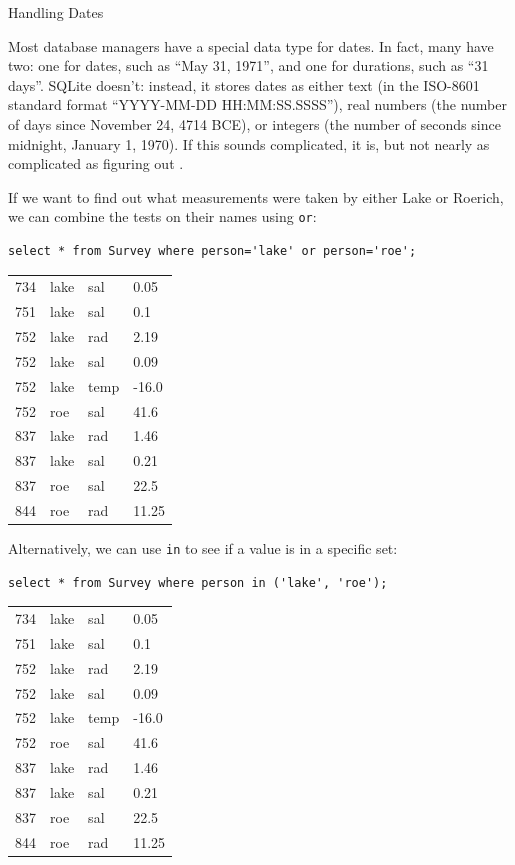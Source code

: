\documentclass{book}
\begin{document}
\begin{swcbox}{Handling Dates}

Most database managers have a special data type for dates. In fact, many
have two: one for dates, such as ``May 31, 1971'', and one for
durations, such as ``31 days''. SQLite doesn't: instead, it stores dates
as either text (in the ISO-8601 standard format ``YYYY-MM-DD
HH:MM:SS.SSSS''), real numbers (the number of days since November 24,
4714 BCE), or integers (the number of seconds since midnight, January 1,
1970). If this sounds complicated, it is, but not nearly as complicated
as figuring out
.

\end{swcbox}

If we want to find out what measurements were taken by either Lake or
Roerich, we can combine the tests on their names using \texttt{or}:

\begin{verbatim}
select * from Survey where person='lake' or person='roe';
\end{verbatim}

\begin{tabular}{llll}
734 & lake & sal & 0.05 \\
751 & lake & sal & 0.1 \\
752 & lake & rad & 2.19 \\
752 & lake & sal & 0.09 \\
752 & lake & temp & -16.0 \\
752 & roe & sal & 41.6 \\
837 & lake & rad & 1.46 \\
837 & lake & sal & 0.21 \\
837 & roe & sal & 22.5 \\
844 & roe & rad & 11.25 \\
\end{tabular}

Alternatively, we can use \texttt{in} to see if a value is in a specific
set:

\begin{verbatim}
select * from Survey where person in ('lake', 'roe');
\end{verbatim}

\begin{tabular}{llll}
734 & lake & sal & 0.05 \\
751 & lake & sal & 0.1 \\
752 & lake & rad & 2.19 \\
752 & lake & sal & 0.09 \\
752 & lake & temp & -16.0 \\
752 & roe & sal & 41.6 \\
837 & lake & rad & 1.46 \\
837 & lake & sal & 0.21 \\
837 & roe & sal & 22.5 \\
844 & roe & rad & 11.25 \\
\end{tabular}
\end{document}
